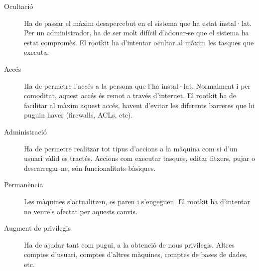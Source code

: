 \begin{description}
    \item[Ocultació] Ha de passar el màxim desapercebut en el sistema que ha
    estat instal·lat. Per un administrador, ha de ser molt difícil d'adonar-se que el
    sistema ha estat compromès. El rootkit ha d'intentar ocultar al màxim les tasques
    que executa.

    \item[Accés] Ha de permetre l'accés a la persona que
    l'ha instal·lat. Normalment i per comoditat, aquest accés és remot a través
    d'internet. El rootkit ha de facilitar al màxim aquest accés, havent d'evitar les diferents 
    barreres que hi puguin haver (firewalls, ACLs, etc).

    \item[Administració] Ha de permetre realitzar tot tipus
    d'accions a la màquina com si d'un usuari vàlid es tractés. Accions com executar
    tasques, editar fitxers, pujar o descarregar-ne, són funcionalitats bàsiques.

    \item[Permanència] Les màquines s'actualitzen, es paren i s'engeguen. El rootkit ha
    d'intentar no veure's afectat per aquests canvis.

    \item[Augment de privilegis] Ha de ajudar tant com pugui, a la obtenció de nous
    privilegis. Altres comptes d'usuari, comptes d'altres màquines, comptes de bases de dades, etc.
\end{description}

